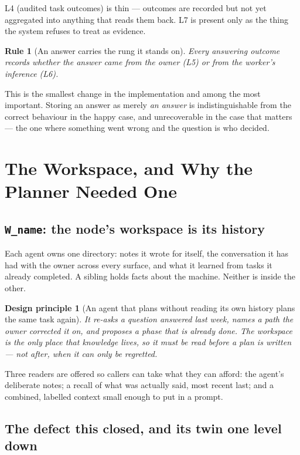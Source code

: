 \documentclass[11pt]{article}
\newtheorem{principle}{Design principle}
\newtheorem{drule}{Rule}
\newcommand{\code}[1]{\texttt{\small #1}}
\begin{document}
L4 (audited task outcomes) is thin --- outcomes are recorded but not yet aggregated into anything that reads them back. L7 is present only as the thing the system refuses to treat as evidence.

\begin{drule}[An answer carries the rung it stands on]
\label{rule:rung}
Every answering outcome records whether the answer came from the owner (L5) or from the worker's inference (L6).
\end{drule}

This is the smallest change in the implementation and among the most important. Storing an answer as merely \emph{an answer} is indistinguishable from the correct behaviour in the happy case, and unrecoverable in the case that matters --- the one where something went wrong and the question is who decided.

\section{The Workspace, and Why the Planner Needed One}
\label{sec:workspace}

\subsection{\code{W\_name}: the node's workspace is its history}

Each agent owns one directory: notes it wrote for itself, the conversation it has had with the owner across every surface, and what it learned from tasks it already completed. A sibling holds facts about the machine. Neither is inside the other.

\begin{principle}[An agent that plans without reading its own history plans the same task again]
\label{prin:history}
It re-asks a question answered last week, names a path the owner corrected it on, and proposes a phase that is already done. The workspace is the only place that knowledge lives, so it must be read \emph{before} a plan is written --- not after, when it can only be regretted.
\end{principle}

Three readers are offered so callers can take what they can afford: the agent's deliberate notes; a recall of what was actually said, most recent last; and a combined, labelled context small enough to put in a prompt.

\subsection{The defect this closed, and its twin one level down}
\end{document}
